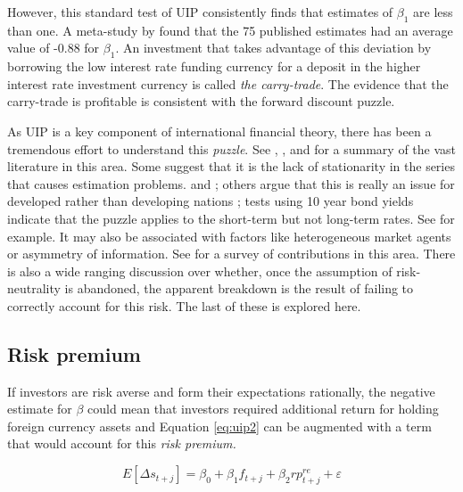 \documentclass[12pt, a4paper, oneside]{article}\usepackage[]{graphicx}\usepackage[]{color}
\begin{document}
However, this standard test of UIP consistently finds that estimates of  $\beta_1$ are less than one.  A meta-study by \citet{FrootUIP} found that the 75 published estimates had an average value of -0.88 for $\beta_1$.   An investment that takes advantage of this deviation by borrowing the low interest rate funding currency for a deposit in the higher interest rate investment currency is called \emph{the carry-trade}.  The evidence that the carry-trade is profitable is consistent with the forward discount puzzle.  

As UIP is a key component of international financial theory, there has been a tremendous effort to understand this \emph{puzzle}.  See \citet{FrootUIP}, \citet{Hodrick1987},  \citet{Engel1996} and \citet{EngelHandbook} for a summary of the vast literature in this area. Some suggest that it is the lack of stationarity in the series that causes estimation problems.  \citet{Engel1996} and \citet{Roll2000}; others argue that this is really an issue for developed rather than developing nations \citet{Bansal1999};  tests using 10 year bond yields indicate that the puzzle applies to the short-term but not long-term rates.  See \citet{Chinn2004} for example.  It may also be associated with factors like heterogeneous market agents or asymmetry of information. See \citet{Bacchetta2012} for a survey of contributions in this area. There is also a wide ranging discussion over whether, once the assumption of risk-neutrality is abandoned, the apparent breakdown is the result of failing to correctly account for this risk. The last of these is explored here. 

\subsection{Risk premium}
If investors are risk averse and form their expectations rationally, the negative estimate for $\beta$ could mean that investors required additional return for holding foreign currency assets and Equation \ref{eq:uip2} can be augmented with a term that would account for this \emph{risk premium.}  

\begin{equation}
\label{eqref:fb1}
E[\Delta s_{t + j}]= \beta_0 +\beta_1 f_{t+j} + \beta_2 rp^{re}_{t +j} + \varepsilon
\end{equation}
\end{document}
